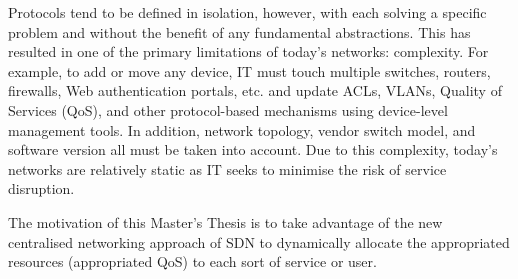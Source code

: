 
Protocols tend to be defined in isolation, however, with each solving a specific problem and without the benefit of any fundamental abstractions. This has resulted in one of the primary limitations of today's networks: complexity. For example, to add or move any device, IT must touch 
multiple switches, routers, firewalls, Web authentication portals, etc. and update ACLs, VLANs, Quality of Services (QoS), and other protocol-based mechanisms using device-level management tools. In addition, network topology, vendor switch model, and software version all must be taken into 
account. Due to this complexity, today's networks are relatively static as IT seeks to minimise the risk of service disruption.

The motivation of this Master's Thesis is to take advantage of the new centralised networking approach of SDN to dynamically allocate the appropriated resources (appropriated QoS) to each sort of service or user.    








